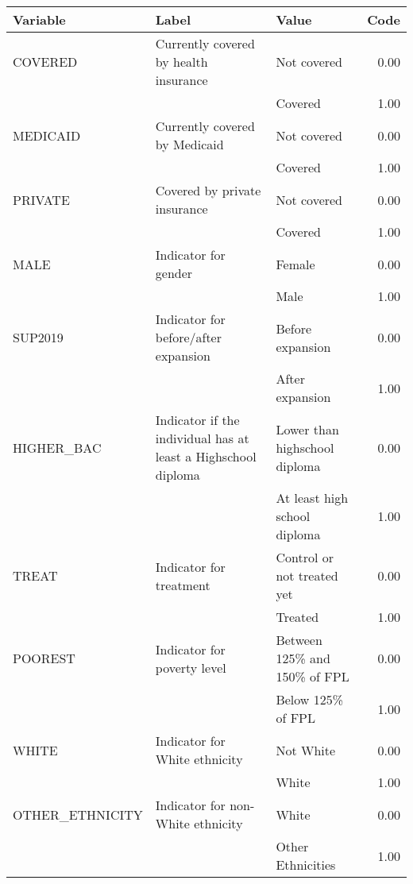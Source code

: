 \begin{table}[ht]
\centering
\begin{tabular}{lllr}
  \hline
Variable & Label & Value & Code \\ 
  \hline
COVERED & Currently covered by health insurance & Not covered & 0.00 \\ 
   &  & Covered & 1.00 \\ 
  MEDICAID & Currently covered by Medicaid & Not covered & 0.00 \\ 
   &  & Covered & 1.00 \\ 
  PRIVATE & Covered by private insurance & Not covered & 0.00 \\ 
   &  & Covered & 1.00 \\ 
  MALE & Indicator for gender & Female & 0.00 \\ 
   &  & Male & 1.00 \\ 
  SUP2019 & Indicator for before/after expansion & Before expansion & 0.00 \\ 
   &  & After expansion & 1.00 \\ 
  HIGHER\_BAC & Indicator if the individual has at least a Highschool diploma & Lower than highschool diploma & 0.00 \\ 
   &  & At least high school diploma & 1.00 \\ 
  TREAT & Indicator for treatment & Control or not treated yet & 0.00 \\ 
   &  & Treated & 1.00 \\ 
  POOREST & Indicator for poverty level & Between 125\% and 150\% of FPL & 0.00 \\ 
   &  & Below 125\% of FPL & 1.00 \\ 
  WHITE & Indicator for White ethnicity & Not White & 0.00 \\ 
   &  & White & 1.00 \\ 
  OTHER\_ETHNICITY & Indicator for non-White ethnicity & White & 0.00 \\ 
   &  & Other Ethnicities & 1.00 \\ 
   \hline
\end{tabular}
\end{table}

